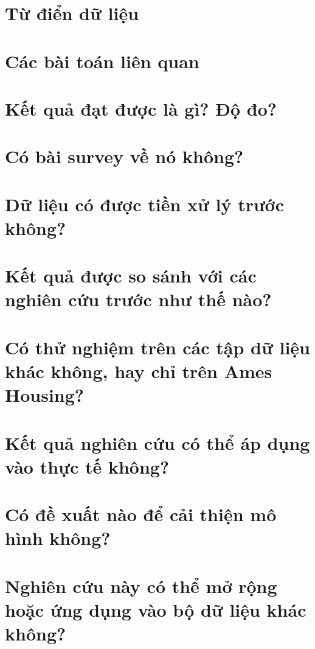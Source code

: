 \documentclass{article}
\begin{document}
\section{Từ điển dữ liệu}


\section{Các bài toán liên quan}


\section{Kết quả đạt được là gì? Độ đo?}


\section{Có bài survey về nó không?}


\section{Dữ liệu có được tiền xử lý trước không?}


\section{Kết quả được so sánh với các nghiên cứu trước như thế nào?}


\section{Có thử nghiệm trên các tập dữ liệu khác không, hay chỉ trên Ames Housing?}


\section{Kết quả nghiên cứu có thể áp dụng vào thực tế không?}


\section{Có đề xuất nào để cải thiện mô hình không?}


\section{Nghiên cứu này có thể mở rộng hoặc ứng dụng vào bộ dữ liệu khác không?}

\end{document}

